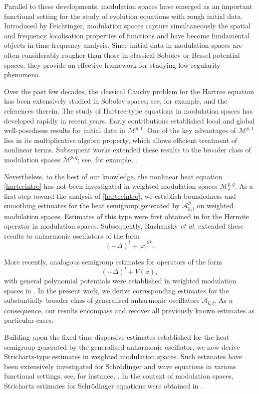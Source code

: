 \documentclass[12pt,reqno,a4paper]{amsart}
\numberwithin{equation}{section}
\theoremstyle{plain}
\theoremstyle{definition}
\theoremstyle{remark}
\def\M{\mathcal{M}}
\def \Ad{\mathcal{A}_{k,l}}
\def \M{{\mathcal M}}
\begin{document}
Parallel to these developments, modulation spaces have emerged as an important functional setting for the study of evolution equations with rough initial data. Introduced by Feichtinger, modulation spaces capture simultaneously the spatial and frequency localisation properties of functions and have become fundamental objects in time-frequency analysis. Since initial data in modulation spaces are often considerably rougher than those in classical Sobolev or Bessel potential spaces, they provide an effective framework for studying low-regularity phenomena.

Over the past few decades, the classical Cauchy problem for the Hartree equation has been extensively studied in Sobolev spaces; see, for example, \cite{MR3195768, MR2002047, MR562582} and the references therein. The study of Hartree-type equations in modulation spaces has developed rapidly in recent years. Early contributions established local \cite{MR2506839} and global \cite{MR2281189} well-posedness results for initial data in $\M^{p,1}$. One of the key advantages of $\M^{p,1}$ lies in its multiplicative algebra property, which allows efficient treatment of nonlinear terms.  Subsequent works extended these results to the broader class of modulation spaces $\M^{p,q}$; see, for example, \cite{MR3977119,MR4944042,MR4017418}.

Nevertheless, to the best of our knowledge, the nonlinear heat equation \eqref{harteeintro} has not been investigated in weighted modulation spaces $\M_s^{p,q}$.
As a first step toward the analysis of \eqref{harteeintro}, we establish boundedness and smoothing estimates for the heat semigroup generated by \(\Ad^{\beta}\) on weighted modulation spaces. Estimates of this type were first obtained in \cite{MR4313961} for the Hermite operator in modulation spaces. Subsequently, Ruzhansky \emph{et al.} \cite{MR4944933} extended these results to anharmonic oscillators of the form
\[
(-\Delta)^l+|x|^{2k}.
\]

More recently, analogous semigroup estimates for operators of the form
\[
(-\Delta)^l+V(x),
\]
with general polynomial potentials were established in weighted modulation spaces in \cite{dasgupta2026phase}. In the present work, we derive corresponding estimates for the substantially broader class of generalised anharmonic oscillators \(\Ad\). As a consequence, our results encompass and recover all previously known estimates as particular cases.
 
 Building upon the fixed-time dispersive estimates established for the heat semigroup generated by the generalised anharmonic oscillator, we now derive Strichartz-type estimates in weighted modulation spaces. Such estimates have been extensively investigated for Schr\"odinger and wave equations in various functional settings; see, for instance, \cite{MR2350410, MR1646048, MR1351643, MR2060533}. In the context of modulation spaces, Strichartz estimates for Schr\"odinger equations were obtained in \cite{MR2992993, MR3065071}. 
\end{document}
